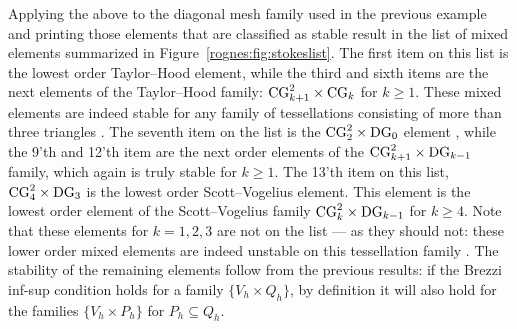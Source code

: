 Applying the above to the diagonal mesh family used in the previous
example and printing those elements that are classified as stable
result in the list of mixed elements summarized in
Figure~\ref{rognes:fig:stokeslist}. The first item on this list is the
lowest order Taylor--Hood element, while the third and sixth items are
the next elements of the Taylor--Hood family:
$\mathrm{CG}_{k+1}^2 \times \mathrm{CG}_{k}$ for $k \geq
1$. These mixed elements are indeed stable for any family of
tessellations consisting of more than three
triangles \citep{TaylorHood1973, Stenberg1984, BrezziFalk1991}. The
seventh item on the list is the
$\mathrm{CG}_2^2 \times \mathrm{DG}_0$
element \citep{CrouzeixRaviart1973}, while the 9'th and 12'th item are
the next order elements of the $\mathrm{CG}_{k+1}^2 \times
\mathrm{DG}_{k-1}$ family, which again is truly stable for $k \geq
1$. The 13'th item on this list, $\mathrm{CG}_4^2 \times
\mathrm{DG}_3$ is the lowest order Scott--Vogelius element. This element
is the lowest order element of the Scott--Vogelius family
$\mathrm{CG}_{k}^2 \times \mathrm{DG}_{k-1}$ for $k \geq 4$. Note that
these elements for $k = 1, 2, 3$ are not on the list --- as they
should not: these lower order mixed elements are indeed unstable on
this tessellation family \citep{Qin1994}. The stability of the
remaining elements follow from the previous results: if the Brezzi
inf-sup condition holds for a family $\{V_h \times Q_h\}$, by
definition it will also hold for the families $\{V_h \times P_h\}$ for
$P_h \subseteq Q_h$.
